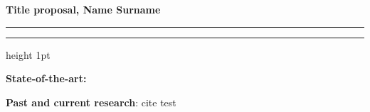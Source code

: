 \documentclass[12pt]{article}
\newcommand{\soptitle}{Title proposal}
\newcommand{\yourname}{Name Surname}
\begin{document}
\begin{center}
\large\textbf{\soptitle, \yourname}
\end{center}

\hrule
\vspace{0.4pt}
\hrule height 1pt
\vspace{5pt}


\large 


\vspace{5pt}

\noindent \textbf{State-of-the-art:} 

\vspace{5pt}
\noindent \textbf{Past and current research}: 
cite test \cite{Takada:2003ef}


\newpage 
{}
\large 

% 

\end{document}
